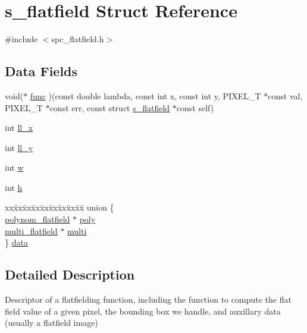 \hypertarget{structs__flatfield}{
\section{s\_\-flatfield Struct Reference}
\label{structs__flatfield}
}


{\ttfamily \#include $<$spc\_\-flatfield.h$>$}\subsection*{Data Fields}
\begin{DoxyCompactItemize}
\item 
void($\ast$ \hyperlink{structs__flatfield_a27ed375a08ad88a9a25ab15f1186daba}{func} )(const double lambda, const int x, const int y, PIXEL\_\-T $\ast$const val, PIXEL\_\-T $\ast$const err, const struct \hyperlink{structs__flatfield}{s\_\-flatfield} $\ast$const self)
\item 
int \hyperlink{structs__flatfield_a1d7f7b9c4eff24588fe25d35f2a0e3ea}{ll\_\-x}
\item 
int \hyperlink{structs__flatfield_affab7067e6e424adb423dc8de163bd5e}{ll\_\-y}
\item 
int \hyperlink{structs__flatfield_a06769e5af56e9be88885af9cd2e25dd9}{w}
\item 
int \hyperlink{structs__flatfield_a8d217598ba3babf676e72e2d8e1d5068}{h}
\item 
\begin{tabbing}
xx\=xx\=xx\=xx\=xx\=xx\=xx\=xx\=xx\=\kill
union \{\\
\>\hyperlink{structpolynom__flatfield}{polynom\_flatfield} $\ast$ \hyperlink{structs__flatfield_a15327899ebefeb485896f96b795d846e}{poly}\\
\>\hyperlink{structmulti__flatfield}{multi\_flatfield} $\ast$ \hyperlink{structs__flatfield_a34eb871ec49e718e1e1b87d5f219c18d}{multi}\\
\} \hyperlink{structs__flatfield_a8f036c9091ac39aa9d42968bb770af09}{data}\\

\end{tabbing}\end{DoxyCompactItemize}


\subsection{Detailed Description}
Descriptor of a flatfielding function, including the function to compute the flat field value of a given pixel, the bounding box we handle, and auxillary data (usually a flatfield image) 

